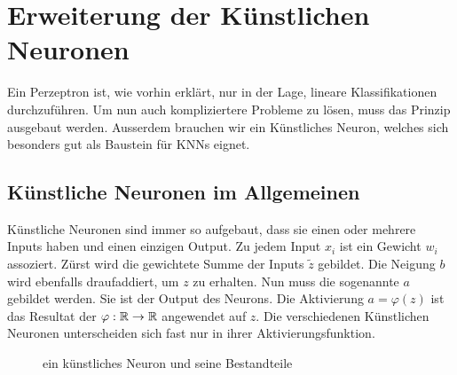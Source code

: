\section{Erweiterung der Künstlichen Neuronen}\label{sec:künstlicheNeuronen}
Ein Perzeptron ist, wie vorhin erklärt, nur in der Lage, lineare Klassifikationen
durchzuführen. Um nun auch kompliziertere Probleme zu lösen, muss das Prinzip
ausgebaut werden. Ausserdem brauchen wir ein Künstliches Neuron, welches sich
besonders gut als Baustein für KNNs eignet.


\subsection{Künstliche Neuronen im Allgemeinen}
Künstliche Neuronen sind immer so aufgebaut, dass sie einen oder mehrere Inputs
haben und einen einzigen Output. Zu jedem Input $x_i$ ist ein Gewicht
$w_{i}$ assoziert. Zürst wird die gewichtete Summe der Inputs $\tilde{z}$ gebildet.
Die Neigung $b$ wird ebenfalls draufaddiert, um $z$ zu erhalten. Nun muss
die sogenannte  $a$ gebildet werden. Sie ist der Output des Neurons.
Die Aktivierung $a = \varphi(z)$ ist das Resultat der
 $\varphi: \mathbb{R} \to \mathbb{R}$ angewendet
auf $z$. Die verschiedenen Künstlichen Neuronen unterscheiden
sich fast nur in ihrer Aktivierungsfunktion.
\\
\begin{figure}[h!]

  \caption{ein künstliches Neuron und seine Bestandteile}
\end{figure}
\\

\para{}
\cite{Nielsen}
\cite{wiki:kuenstliches_neuron}

